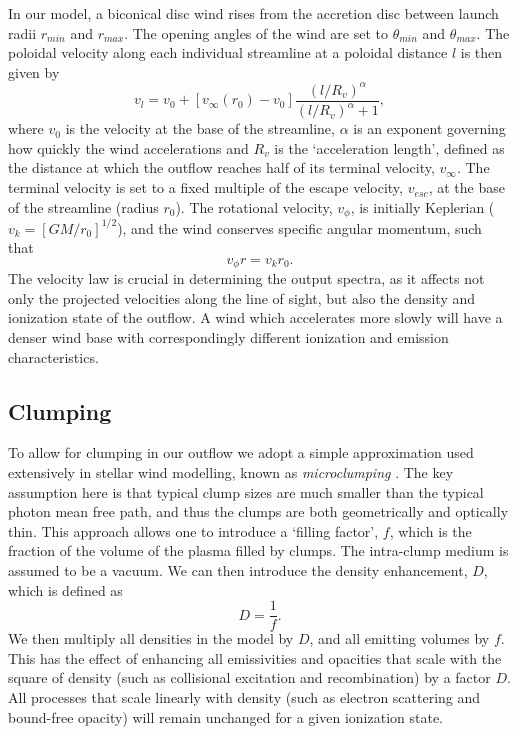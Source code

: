 \documentclass[useAMS,usenatbib]{mn2e_x}
\begin{document}
In our model, a biconical disc wind rises from the accretion 
disc between launch radii $r_{min}$ and $r_{max}$.
The opening angles of the wind are set to $\theta_{min}$ and $\theta_{max}$.
The poloidal velocity along each individual streamline at a poloidal distance $l$ 
is then given by
\begin{equation}
v_l=v_0+\left[v_{\infty}(r_0)-v_0\right]\frac{\left(l/R_v\right)^{\alpha}}{\left(l/R_v\right)^{\alpha}+1},
\label{v_law}
\end{equation}
where $v_0$ is the velocity at the base of the streamline, $\alpha$ is
an exponent governing how quickly the wind accelerations and 
$R_v$ is the `acceleration length', defined as the distance at which
the outflow reaches half of its terminal velocity, $v_{\infty}$.
The terminal velocity is set to a fixed multiple of the escape
velocity, $v_{esc}$, at the base of the streamline (radius $r_0$).
The rotational velocity, $v_{\phi}$, is initially Keplerian ($v_k = [GM/r_0]^{1/2}$),
and the wind conserves specific angular momentum, such that 
\begin{equation}
v_{\phi} r = v_k r_0.
\label{v_law}
\end{equation}
The velocity law is crucial in determining the output spectra,
as it affects not only the projected velocities along the line of sight,
but also the density and ionization state of the outflow.
A wind which accelerates more slowly will have a denser wind base
with correspondingly different ionization and emission characteristics.



\subsection{Clumping}

To allow for clumping in our outflow we adopt a simple approximation
used extensively in stellar wind modelling, known as 
{\em microclumping} \citep{hamann1998}. The key assumption here is that 
typical clump sizes are much smaller than the typical photon mean free path, 
and thus the clumps are 
both geometrically and optically thin. This approach 
allows one to introduce a `filling factor', $f$, which is the 
fraction of the volume of the plasma filled by clumps. The intra-clump
medium is assumed to be a vacuum. We can then introduce the 
density enhancement, $D$, which is defined as 
\begin{equation}
D = \frac{1}{f}.
\end{equation}
We then multiply all densities in the model by $D$, and all emitting volumes
by $f$. This has the effect of enhancing all emissivities and opacities
that scale with the square of density (such as collisional excitation and recombination) 
by a factor $D$. All processes that scale linearly with density 
(such as electron scattering and bound-free opacity)
will remain unchanged for a given ionization state. 
\end{document}
